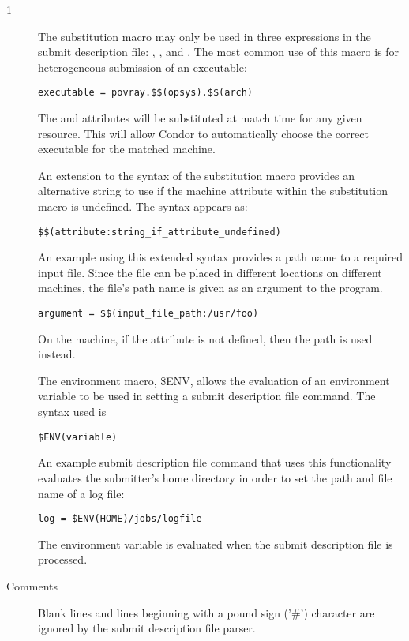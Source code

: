 \begin{ManPage}{\label{man-condor-submit}}{1}
\begin{description}
The substitution macro may only be used in three expressions in the
submit description file: , , and
. The most common use of this macro is for heterogeneous
submission of an executable:
\begin{verbatim}
executable = povray.$$(opsys).$$(arch)
\end{verbatim}
The  and  attributes will be substituted at
match time for any given resource. This will allow Condor to automatically
choose the correct executable for the matched machine.

An extension to the syntax of the substitution macro provides an
alternative string to use if the machine attribute within the
substitution macro is undefined.
The syntax appears as:
\begin{verbatim} 
$$(attribute:string_if_attribute_undefined)
\end{verbatim}

An example using this extended syntax provides a path name to a
required input file.
Since the file can be placed in different locations on
different machines, the file's path name is given as an argument
to the program.
\begin{verbatim} 
argument = $$(input_file_path:/usr/foo)
\end{verbatim}
On the machine, if the attribute  is not
defined, then the path  is used instead.

The environment macro, \$ENV, allows the evaluation of an environment
variable to be used in setting a submit description file command.
The syntax used is
\begin{verbatim} 
$ENV(variable)
\end{verbatim}
An example submit description file command that uses this functionality
evaluates the submitter's home directory in order to set the
path and file name of a log file:
\begin{verbatim} 
log = $ENV(HOME)/jobs/logfile
\end{verbatim}
The environment variable is evaluated when the submit description
file is processed.

\item[Comments] Blank lines and lines beginning with a 
pound sign
('\#')
character are ignored by the submit description file parser. 


\end{description}
\end{ManPage}
